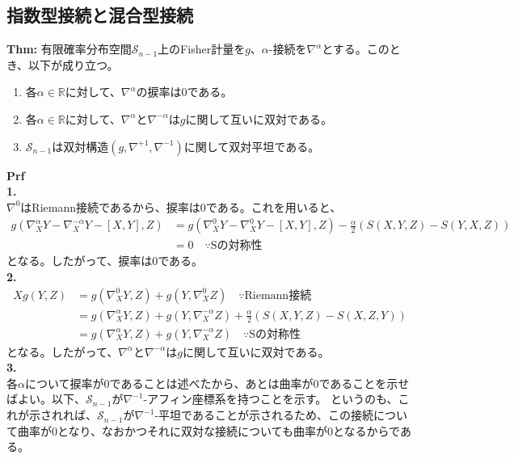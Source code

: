 \documentclass[a4paper,11pt]{jsarticle}
\numberwithin{equation}{section}
\begin{document}
\subsection{指数型接続と混合型接続}
\begin{itembox}[l]{\textbf{Thm:}}
    有限確率分布空間$\mathcal{S}_{n-1}$上のFisher計量を$g$、$\alpha$-接続を$\nabla^{\alpha}$とする。このとき、以下が成り立つ。
    \begin{enumerate}
        \item 各$\alpha \in \mathbb{R}$に対して、$\nabla^{\alpha}$の捩率は0である。
        \item 各$\alpha \in \mathbb{R}$に対して、$\nabla^{\alpha}$と$\nabla^{-\alpha}$は$g$に関して互いに双対である。
        \item $\mathcal{S}_{n-1}$は双対構造$(g,\nabla^{+1},\nabla^{-1})$に関して双対平坦である。
    \end{enumerate}
\end{itembox}
\textbf{Prf}\\
\textbf{1.}\\
$\nabla^{0}$はRiemann接続であるから、捩率は0である。これを用いると、
\begin{align}
    g(\nabla^{\alpha}_X Y-\nabla^{-\alpha}_X Y -[X,Y],Z) &= g(\nabla^{0}_X Y-\nabla^{0}_X Y-[X,Y],Z) - \frac{\alpha}{2} (S(X,Y,Z) - S(Y,X,Z))\\ 
    &= 0 \quad \because \text{Sの対称性}
\end{align}
となる。したがって、捩率は0である。\\
\textbf{2.}\\
\begin{align}
    Xg(Y,Z) &= g(\nabla^{0}_X Y,Z) + g(Y,\nabla^{0}_X Z) \quad \because \text{Riemann接続}\\
    &= g(\nabla^{\alpha}_X Y,Z) + g(Y,\nabla^{-\alpha}_X Z) +\frac{\alpha}{2} (S(X,Y,Z) - S(X,Z,Y))\\
    &= g(\nabla^{\alpha}_X Y,Z) + g(Y,\nabla^{-\alpha}_X Z) \quad \because \text{Sの対称性}
\end{align}
となる。したがって、$\nabla^{\alpha}$と$\nabla^{-\alpha}$は$g$に関して互いに双対である。\\
\textbf{3.}\\
各$\alpha$について捩率が0であることは述べたから、あとは曲率が0であることを示せばよい。以下、$\mathcal{S}_{n-1}$が$\nabla^{-1}$-アフィン座標系を持つことを示す。
というのも、これが示されれば、$\mathcal{S}_{n-1}$が$\nabla^{-1}$-平坦であることが示されるため、この接続について曲率が0となり、なおかつそれに双対な接続についても曲率が0となるからである。\\
\end{document}
